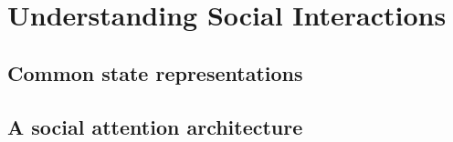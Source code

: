 
\chapter{Understanding Social Interactions}
\label{chapter:4}

\section{Common state representations}
\section{A social attention architecture}